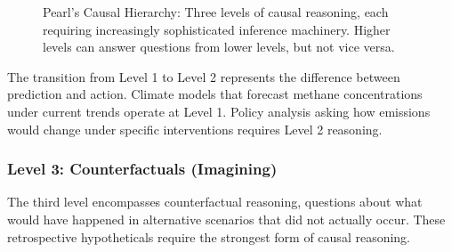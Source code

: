 \begin{figure}[h!]
\centering
{}
\caption{Pearl's Causal Hierarchy: Three levels of causal reasoning, each requiring increasingly sophisticated inference machinery. Higher levels can answer questions from lower levels, but not vice versa.}
\label{fig:causal_hierarchy}
\end{figure}


The transition from Level 1 to Level 2 represents the difference between prediction and action. Climate models that forecast methane concentrations under current trends operate at Level 1. Policy analysis asking how emissions would change under specific interventions requires Level 2 reasoning.

\subsubsection{Level 3: Counterfactuals (Imagining)}

The third level encompasses counterfactual reasoning, questions about what would have happened in alternative scenarios that did not actually occur. These retrospective hypotheticals require the strongest form of causal reasoning.

